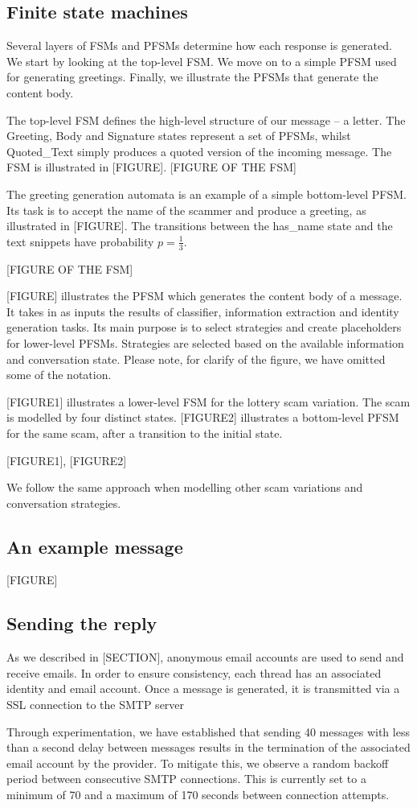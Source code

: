 \subsection{Finite state machines}

Several layers of FSMs and PFSMs determine how each response is generated. We start by looking at the top-level FSM. We move on to a simple PFSM used for generating greetings. Finally, we illustrate the PFSMs that generate the content body.

The top-level FSM defines the high-level structure of our message -- a letter. The Greeting, Body and Signature states represent a set of PFSMs, whilst Quoted\_Text simply produces a quoted version of the incoming message. The FSM is illustrated in [FIGURE].
[FIGURE OF THE FSM]

The greeting generation automata is an example of a simple bottom-level PFSM. Its task is to accept the name of the scammer and produce a greeting, as illustrated in [FIGURE]. The transitions between the has\_name state and the text snippets have probability $p = \frac{1}{3}$.

[FIGURE OF THE FSM]

[FIGURE] illustrates the PFSM which generates the content body of a message. It takes in as inputs the results of classifier, information extraction and identity generation tasks. Its main purpose is to select strategies and create placeholders for lower-level PFSMs. Strategies are selected based on the available information and conversation state. Please note, for clarify of the figure, we have omitted some of the notation.

[FIGURE1] illustrates a lower-level FSM for the lottery scam variation. The scam is modelled by four distinct states. [FIGURE2] illustrates a bottom-level PFSM for the same scam, after a transition to the initial state.

[FIGURE1], [FIGURE2]

We follow the same approach when modelling other scam variations and conversation strategies.

\subsection{An example message}

[FIGURE]

\subsection{Sending the reply}

As we described in [SECTION], anonymous email accounts are used to send and receive emails. In order to ensure consistency, each thread has an associated identity and email account. Once a message is generated, it is transmitted via a SSL connection to the SMTP server

Through experimentation, we have established that sending 40 messages with less than a second delay between messages results in the termination of the associated email account by the provider. To mitigate this, we observe a random backoff period between consecutive SMTP connections. This is currently set to a minimum of 70 and a maximum of 170 seconds between connection attempts.